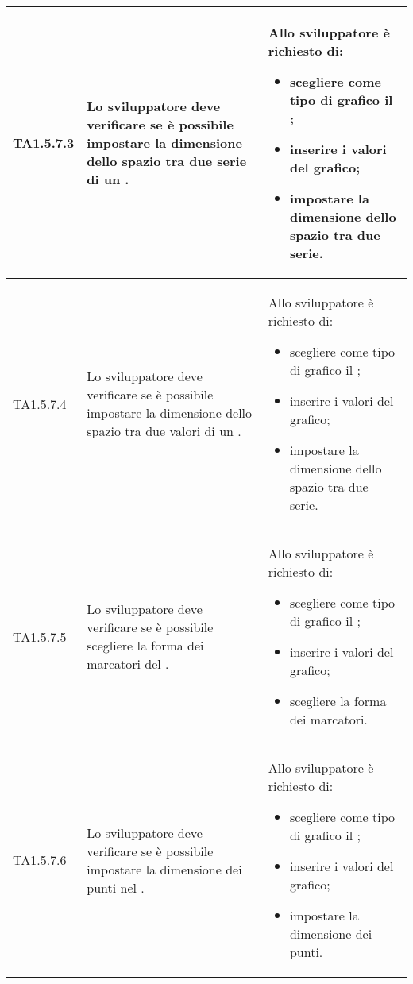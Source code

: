 \begin{longtabu}{| X[0.5] | X | X |}
	TA1.5.7.3 & Lo sviluppatore deve verificare se è possibile impostare la dimensione dello spazio tra due serie di un .

		& Allo sviluppatore è richiesto di:
		\begin{itemize}
			\item scegliere come tipo di grafico il ;
			\item inserire i valori del grafico;
			\item impostare la dimensione dello spazio tra due serie.
		\end{itemize}
\\ \hline

	TA1.5.7.4 & Lo sviluppatore deve verificare se è possibile impostare la dimensione dello spazio tra due valori di un .

		& Allo sviluppatore è richiesto di:
		\begin{itemize}
			\item scegliere come tipo di grafico il ;
			\item inserire i valori del grafico;
			\item impostare la dimensione dello spazio tra due serie.
		\end{itemize}
\\ \hline

	TA1.5.7.5 & Lo sviluppatore deve verificare se è possibile scegliere la forma dei marcatori del .

		& Allo sviluppatore è richiesto di:
		\begin{itemize}
			\item scegliere come tipo di grafico il ;
			\item inserire i valori del grafico;
			\item scegliere la forma dei marcatori.
		\end{itemize}
\\ \hline

	TA1.5.7.6 & Lo sviluppatore deve verificare se è possibile impostare la dimensione dei punti nel .

		& Allo sviluppatore è richiesto di:
		\begin{itemize}
			\item scegliere come tipo di grafico il ;
			\item inserire i valori del grafico;
			\item impostare la dimensione dei punti.
		\end{itemize}
\\ \hline


\end{longtabu}

